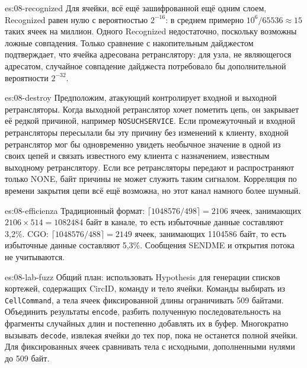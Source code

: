 \begin{soluzione}{es:08-recognized}
Для ячейки, всё ещё зашифрованной ещё одним слоем, Recognized равен нулю с вероятностью $2^{-16}$: в среднем примерно $10^6 / 65536 \approx 15$ таких ячеек на миллион. Одного Recognized недостаточно, поскольку возможны ложные совпадения. Только сравнение с накопительным дайджестом подтверждает, что ячейка адресована ретранслятору: для узла, не являющегося адресатом, случайное совпадение дайджеста потребовало бы дополнительной вероятности $2^{-32}$.
\end{soluzione}

\begin{soluzione}{es:08-destroy}
Предположим, атакующий контролирует входной и выходной ретрансляторы. Когда выходной ретранслятор хочет пометить цепь, он закрывает её редкой причиной, например \texttt{NOSUCHSERVICE}. Если промежуточный и входной ретрансляторы пересылали бы эту причину без изменений к клиенту, входной ретранслятор мог бы одновременно увидеть необычное значение в одной из своих цепей и связать известного ему клиента с назначением, известным выходному ретранслятору. Если все ретрансляторы передают и распространяют только NONE, байт причины не может служить таким сигналом. Корреляция по времени закрытия цепи всё ещё возможна, но этот канал намного более шумный.
\end{soluzione}

\begin{soluzione}{es:08-efficienza}
Традиционный формат: $\lceil 1048576/498 \rceil = 2106$ ячеек, занимающих $2106 \times 514 = \num{1082484}$ байт в канале, то есть избыточные данные составляют 3,2\%. CGO: $\lceil 1048576/488 \rceil = 2149$ ячеек, занимающих \num{1104586} байт, то есть избыточные данные составляют 5,3\%. Сообщения SENDME и открытия потока не учитываются.
\end{soluzione}

\begin{soluzione}{es:08-lab-fuzz}
Общий план: использовать Hypothesis для генерации списков кортежей, содержащих CircID, команду и тело ячейки. Команды выбирать из \texttt{CellCommand}, а тела ячеек фиксированной длины ограничивать 509 байтами. Объединить результаты \texttt{encode}, разбить полученную последовательность на фрагменты случайных длин и постепенно добавлять их в буфер. Многократно вызывать \texttt{decode}, извлекая ячейки до тех пор, пока не останется полной ячейки. Для фиксированных ячеек сравнивать тела с исходными, дополненными нулями до 509 байт.
\end{soluzione}

